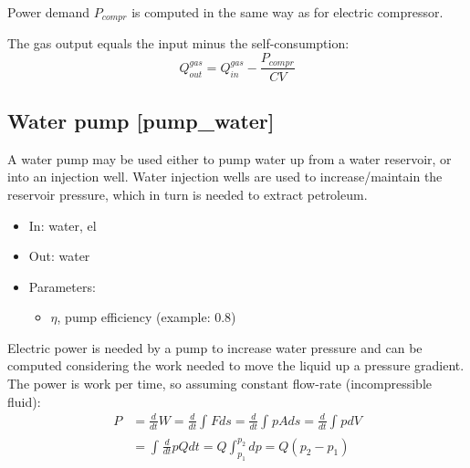 \documentclass[12pt]{article}
\begin{document}
\medskip\noindent
Power demand  \( P_{compr} \)  is computed in the same way as for electric compressor.

The gas output equals the input minus the self-consumption:
 \begin{equation}
 	Q_{out}^{gas}=Q_{in}^{gas}-\frac{P_{compr}}{CV} 
\end{equation}



\subsection{Water pump [pump\_water]}

A water pump may be used either to pump water up from a water reservoir, or into an injection well. Water injection wells are used to increase/maintain the reservoir pressure, which in turn is needed to extract petroleum.  


\begin{itemize}
\item In: water, el
\item Out: water
\item Parameters:
\begin{itemize}[noitemsep,topsep=0pt]
	\item $\eta$,  pump efficiency (example: 0.8)
\end{itemize}
\end{itemize}

\medskip\noindent
Electric power is needed by a pump to increase water pressure and can be computed considering the work needed to move the liquid up a pressure gradient. The power is work per time, so assuming constant flow-rate (incompressible fluid):
 \begin{equation}
 \begin{split}
 P &=\frac{d}{dt}W
	 =\frac{d}{dt} \int _{}^{}Fds
	 =\frac{d}{dt} \int _{}^{}pAds
	 =\frac{d}{dt} \int _{}^{}pdV
	 \\& 
	 = \int _{}^{}\frac{d}{dt}pQdt
	 =Q \int _{p_{1}}^{p_{2}}dp
	 =Q \left( p_{2}-p_{1} \right)  
 \end{split}
 \end{equation}
\end{document}
